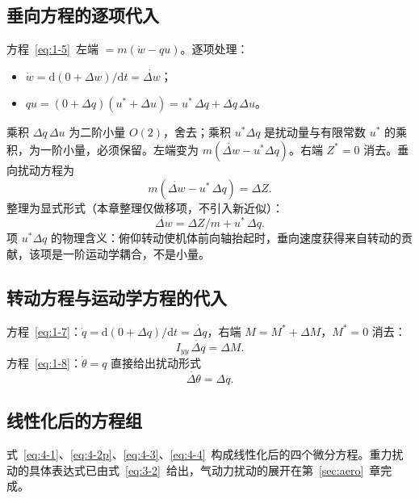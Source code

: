 \documentclass[11pt,a4paper]{ctexart}
\newcommand{\ud}[1]{\dot{#1}}
\newcommand{\dd}{\mathrm{d}}
\begin{document}
\subsection{垂向方程的逐项代入}

方程~\eqref{eq:1-5}~左端 $=m(\ud w-q u)$。逐项处理：
\begin{itemize}[itemsep=1pt]
  \item $\ud w = \dd(0+\Delta w)/\dd t = \ud{\Delta w}$；
  \item $q u = (0+\Delta q)(u^{*}+\Delta u) = u^{*}\,\Delta q + \Delta q\,\Delta u$。
\end{itemize}
乘积 $\Delta q\,\Delta u$ 为二阶小量 $O(2)$，舍去；乘积 $u^{*}\Delta q$ 是扰动量与有限常数 $u^{*}$ 的乘积，为一阶小量，必须保留。左端变为 $m(\ud{\Delta w}-u^{*}\Delta q)$。右端 $Z^{*}=0$ 消去。垂向扰动方程为
\begin{equation}\label{eq:4-2}
m\left(\ud{\Delta w} - u^{*}\,\Delta q\right) = \Delta Z.
\tag{(4-2)}
\end{equation}
整理为显式形式（本章整理仅做移项，不引入新近似）：
\begin{equation}\label{eq:4-2p}
\ud{\Delta w} = \Delta Z/m + u^{*}\,\Delta q.
\tag{(4-2$'$)}
\end{equation}
项 $u^{*}\Delta q$ 的物理含义：俯仰转动使机体前向轴抬起时，垂向速度获得来自转动的贡献，该项是一阶运动学耦合，不是小量。

\subsection{转动方程与运动学方程的代入}

方程~\eqref{eq:1-7}：$\ud q = \dd(0+\Delta q)/\dd t=\ud{\Delta q}$，右端 $M=M^{*}+\Delta M$，$M^{*}=0$ 消去：
\begin{equation}\label{eq:4-3}
I_{yy}\,\ud{\Delta q} = \Delta M.
\tag{(4-3)}
\end{equation}
方程~\eqref{eq:1-8}：$\ud\theta=q$ 直接给出扰动形式
\begin{equation}\label{eq:4-4}
\ud{\Delta\theta} = \Delta q.
\tag{(4-4)}
\end{equation}

\subsection{线性化后的方程组}

式~\eqref{eq:4-1}、\eqref{eq:4-2p}、\eqref{eq:4-3}、\eqref{eq:4-4}~构成线性化后的四个微分方程。重力扰动的具体表达式已由式~\eqref{eq:3-2}~给出，气动力扰动的展开在第~\ref{sec:aero}~章完成。
\end{document}
